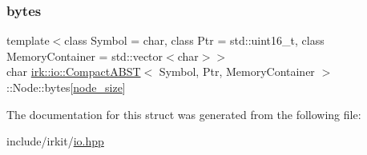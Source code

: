 \subsubsection{\texorpdfstring{bytes}{bytes}}
{\footnotesize\ttfamily template$<$class Symbol = char, class Ptr = std\+::uint16\+\_\+t, class Memory\+Container = std\+::vector$<$char$>$$>$ \\
char \mbox{\hyperlink{classirk_1_1io_1_1CompactABST}{irk\+::io\+::\+Compact\+A\+B\+ST}}$<$ Symbol, Ptr, Memory\+Container $>$\+::Node\+::bytes\mbox{[}\mbox{\hyperlink{classirk_1_1io_1_1CompactABST_a7d730c8d8ba0519397927b08dea7dbbb}{node\+\_\+size}}\mbox{]}}



The documentation for this struct was generated from the following file\+:\begin{DoxyCompactItemize}
\item 
include/irkit/\mbox{\hyperlink{io_8hpp}{io.\+hpp}}\end{DoxyCompactItemize}
